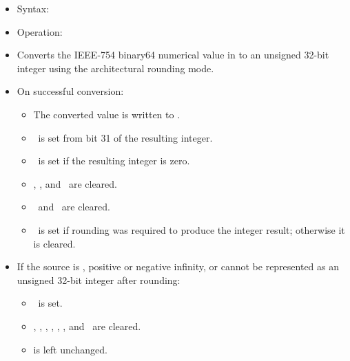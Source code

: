 \begin{itemize}
\item Syntax: 
\item Operation: 
\item Converts the IEEE-754 binary64 numerical value in  to an
      unsigned 32-bit integer using the architectural rounding mode.
\item On successful conversion:
      \begin{itemize}
      \item The converted value is written to .
      \item \flagN\ is set from bit 31 of the resulting integer.
      \item \flagZ\ is set if the resulting integer is zero.
      \item \flagC, \flagV, and \flagE\ are cleared.
      \item \flagI\ and \flagU\ are cleared.
      \item \flagX\ is set if rounding was required to produce the integer result;
      otherwise it is cleared.
      \end{itemize}
\item If the source is , positive or negative infinity, or cannot
      be represented as an unsigned 32-bit integer after rounding:
      \begin{itemize}
      \item \flagE\ is set.
      \item \flagN, \flagZ, \flagC, \flagV, \flagI, \flagU, and \flagX\ are cleared.
      \item {} is left unchanged.
      \end{itemize}
\end{itemize}

\subsection{}

